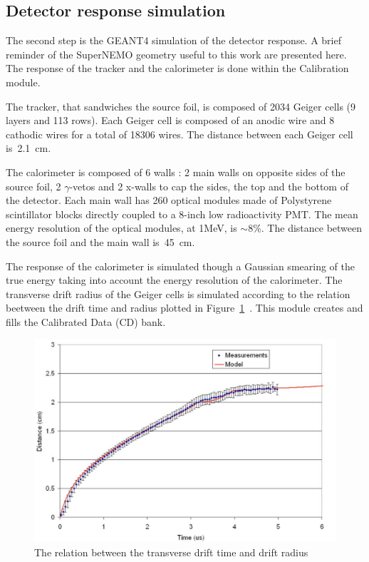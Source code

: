 \documentclass[main.tex]{subfiles}
\begin{document}
\FloatBarrier


\subsection{Detector response simulation}\label{sec:DectectorResponseBi214}


\noindent The second step is the GEANT4 simulation of the detector response. A brief reminder of the SuperNEMO geometry useful to this work are presented here. The response of the tracker and the calorimeter is done within the Calibration module.


\bigskip


\noindent The tracker, that sandwiches the source foil, is composed of 2034 Geiger cells (9 layers and 113 rows). Each Geiger cell is composed of an anodic wire and 8 cathodic wires for a total of 18306 wires. The distance between each Geiger cell is~2.1~cm.


\bigskip


\noindent The calorimeter is composed of 6 walls : 2 main walls on opposite sides of the source foil, 2 $\gamma$-vetos and 2 x-walls to cap the sides, the top and the bottom of the detector. Each main wall has 260 optical modules made of Polystyrene scintillator blocks directly coupled to a 8-inch low radioactivity PMT. The mean energy resolution of the optical modules, at 1MeV, is $\sim$8\%. The distance between the source foil and the main wall is~45~cm.   


\bigskip


\noindent The response of the calorimeter is simulated though a Gaussian smearing of the true energy taking into account the energy resolution of the calorimeter. The transverse drift radius of the Geiger cells is simulated according to the relation beetween the drift time and radius plotted in Figure~\ref{drift_time}~\cite{DriftTimeModel}. This module creates and fills the Calibrated Data (CD) bank.


\begin{figure}[h!]
\begin{center}
\includegraphics[scale=0.25]{pictures/Chap5/drift_time.png}
\caption{The relation between the transverse drift time and drift radius}
\label{drift_time}
\end{center}
\end{figure}
\end{document}
